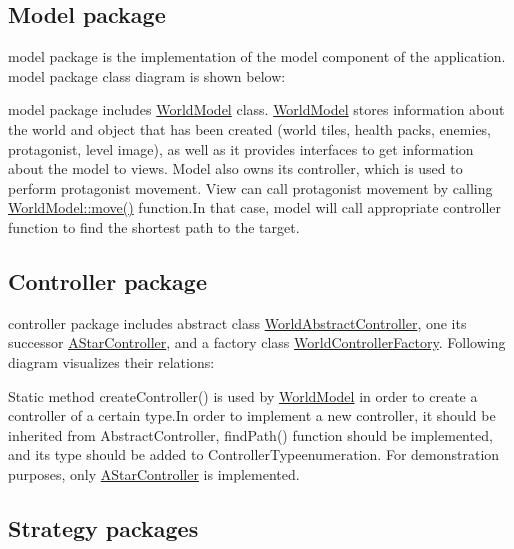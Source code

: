 \subsection*{Model package}

{\ttfamily model} package is the implementation of the model component of the application. {\ttfamily model} package class diagram is shown below\+:



{\ttfamily model} package includes {\ttfamily \hyperlink{classWorldModel}{World\+Model}} class. {\ttfamily \hyperlink{classWorldModel}{World\+Model}} stores information about the world and object that has been created (world tiles, health packs, enemies, protagonist, level image), as well as it provides interfaces to get information about the model to views. Model also owns its controller, which is used to perform protagonist movement. View can call protagonist movement by calling {\ttfamily \hyperlink{classWorldModel_ae02716d99230f6edb0f7caf5b469bc1c}{World\+Model\+::move()}} function.\+In that case, model will call appropriate controller function to find the shortest path to the target.

\subsection*{Controller package}

{\ttfamily controller} package includes abstract class {\ttfamily \hyperlink{classWorldAbstractController}{World\+Abstract\+Controller}}, one its successor {\ttfamily \hyperlink{classAStarController}{A\+Star\+Controller}}, and a factory class {\ttfamily \hyperlink{classWorldControllerFactory}{World\+Controller\+Factory}}. Following diagram visualizes their relations\+:



Static method {\ttfamily create\+Controller()} is used by \hyperlink{classWorldModel}{World\+Model} in order to create a controller of a certain type.\+In order to implement a new controller, it should be inherited from {\ttfamily Abstract\+Controller}, {\ttfamily find\+Path()} function should be implemented, and its type should be added to {\ttfamily Controller\+Type}enumeration. For demonstration purposes, only {\ttfamily \hyperlink{classAStarController}{A\+Star\+Controller}} is implemented.

\subsection*{Strategy packages}

